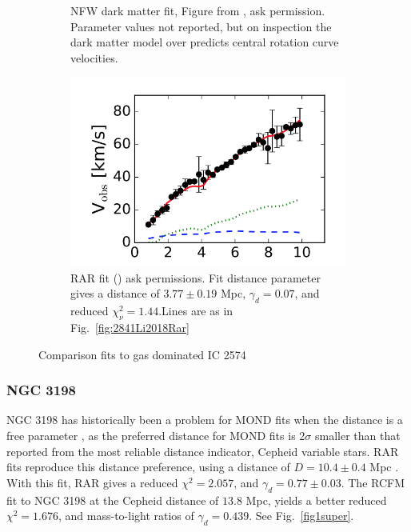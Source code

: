 \documentclass[reprint,%
 amsmath,amssymb,
 aps,
]{revtex4-1}
\begin{document}
\begin{figure}[ht]
\begin{subfigure}[b]{0.5\linewidth}
    \caption{NFW dark matter fit, Figure from \cite{2017MNRAS.471.1841N}, ask permission. Parameter values not reported, but on inspection the dark matter model over predicts central rotation curve velocities.} 
    \label{fig:Nav17} 
    \vspace{4ex}
  \end{subfigure} 
    \begin{subfigure}[b]{0.5\linewidth}
    \centering
    \includegraphics[width=0.95\linewidth]{figures/IC2574_Li.png} 
    \caption{  RAR fit (\cite{Li_2018})   ask permissions. Fit distance parameter gives a distance of $3.77 \pm 0.19$ Mpc, $\gamma_d =0.07 $, and reduced $\chi^2_\nu = 1.44$.Lines are as in Fig.~\ref{fig:2841Li2018Rar}} 
    \label{fig:Nav17} 
    \vspace{4ex}
  \end{subfigure} 
  \caption{ Comparison
fits to   gas dominated IC 2574  }
  \label{fig:CompareIC2574} 
\end{figure}

\subsubsection{NGC 3198}

  NGC 3198 has historically been a problem  for MOND fits when the distance is a free parameter
\cite{Gent}, as the preferred distance for MOND fits is 2$\sigma$ smaller than that reported from  the most reliable distance indicator, Cepheid variable stars. RAR fits reproduce this distance preference, using a distance of
$ D = 10.4 \pm 0.4$ Mpc  \cite{Li_2018}. With this fit,  RAR gives a reduced
$\chi^2 = 2.057$, and $\gamma_d = 0.77 \pm 0.03$. The RCFM fit to  NGC 3198 at the Cepheid  distance  of 
$13.8$ Mpc, yields  a better reduced $\chi^2 = 1.676$, and mass-to-light ratios of  $\gamma_d = 0.439$.   See Fig.~\ref{fig1super}. 
\end{document}
